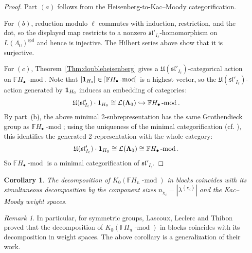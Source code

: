 \documentclass[12pt]{amsart}
\numberwithin{itemcounter}{subsection}
\theoremstyle{plain}
\newtheorem{corollary}[theorem]{Corollary}
\theoremstyle{definition}
\theoremstyle{remark}
\newtheorem{remark}[theorem]{Remark}
\numberwithin{equation}{section}
\def\bbF{\mathbb{F}}
\def\fraks{\mathfrak{s}}
\def\frakl{\mathfrak{l}}
\def\frakU{\mathfrak{U}}
\def\calL{\mathcal{L}}
\def\frakl{\mathfrak{l}}
\def\mod{\operatorname{-mod}\nolimits}
\begin{document}
								\begin{proof}
                                    Part $(a)$ follows from the Heisenberg-to-Kac--Moody categorification.

                                    For $(b)$, reduction modulo $\ell$ commutes with induction, restriction, and the dot, so the displayed map restricts to a nonzero $\fraks\frakl'_{I_\ell}$-homomorphism on $L(\Lambda_0)^{\otimes d}$ and hence is injective. The Hilbert series above show that it is surjective.

                                    For $(c)$, Theorem~\ref{Thm:doubleheisenberg} gives a $\frakU(\fraks\frakl'_{I_\ell})$-categorical action on $\bbF H _{\bullet}\mod$.
            Note that $[{\bf1}_{ H _0}]\in [\bbF H _{\bullet}\mod]$ is a highest vector,  so the $\frakU(\fraks\frakl'_{I_\ell})$-action generated by ${\bf1}_{H_0}$ induces an embedding of categories:
                    $$\frakU(\fraks\frakl'_{I_\ell})\cdot {\bf1}_{H_0}\cong \calL(\boldsymbol{\Lambda}_0)\hookrightarrow \bbF H _{\bullet}\mod.$$
                        By part~(b), the above minimal 2-subrepresentation has the same Grothendieck group as $\bbF H _\bullet\mod$; using the uniqueness of the minimal categorification (cf. \cite{R08}), this identifies the generated 2-representation with the whole category:
                    $$\frakU(\fraks\frakl'_{I_\ell})\cdot{\bf1}_{H_0}\cong \calL(\boldsymbol{\Lambda}_0)\cong \bbF H _{\bullet}\mod.$$
                                    So $\bbF H _\bullet\mod$ is a minimal categorification of $\fraks\frakl'_{I_\ell}$.
                                \end{proof}

										\begin{corollary}\label{weight=block}
											The decomposition of $K_0(\bbF H _n\mod)$ in blocks coincides with its simultaneous decomposition by the component sizes $n_{\chi_i}=|\lambda^{(\chi_i)}|$ and the Kac--Moody weight spaces.\end{corollary}


										\begin{remark}
											In particular, for symmetric groups, Lascoux, Leclerc and Thibon \cite{LLT} proved that
											the decomposition of $K_0(\bbF H _n\mod)$ in blocks coincides with its decomposition in weight
											spaces.  The above corollary is a generalization of their work.
										\end{remark}
\end{document}

